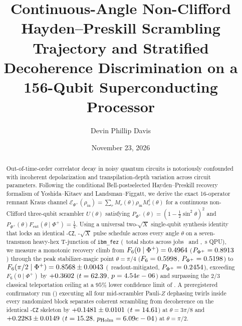 \documentclass[aps,prx,twocolumn,superscriptaddress,nofootinbib]{revtex4-2}
\begin{document}
\title{Continuous-Angle Non-Clifford Hayden--Preskill Scrambling Trajectory and Stratified Decoherence Discrimination on a 156-Qubit Superconducting Processor}

\author{Devin Phillip Davis}
\date{November 23, 2026}

\begin{abstract}
Out-of-time-order correlator decay in noisy quantum circuits is notoriously confounded with incoherent depolarization and transpilation-depth variation across circuit parameters. Following the conditional Bell-postselected Hayden--Preskill recovery formalism of Yoshida--Kitaev and Landsman--Figgatt, we derive the exact 16-operator remnant Kraus channel $\mathcal{E}_{\Phi^+}(\rho_{\mathrm{in}}) = \sum_r M_r(\theta)\rho_{\mathrm{in}}M_r^\dagger(\theta)$ for a continuous non-Clifford three-qubit scrambler $U(\theta)$ satisfying $P_{\Phi^+}(\theta) = (1 - \tfrac{1}{2}\sin^2\theta)^2$ and $P_{\Phi^+}(\theta)F_{\mathrm{ent}}(\theta \mid \Phi^+) = \tfrac{1}{4}$. Using a universal two-$\sqrt{X}$ single-qubit synthesis identity that locks an identical \XtopConstCZ-\texttt{CZ}, \XtopConstSX-$\sqrt{X}$ pulse schedule across every angle $\theta$ on a seven-transmon heavy-hex T-junction of \texttt{ibm\_fez} (\XtopShotsTotal\ total shots across jobs \XtopJobA\ and \XtopJobB, \XtopQpuSecTotal\,s QPU), we measure a monotonic recovery climb from $F_6(0 \mid \Phi^+) = 0.4964$ ($P_{\Phi^+} = 0.8913$) through the peak stabilizer-magic point $\theta = \pi/4$ ($F_6 = 0.5998$, $P_{\Phi^+} = 0.5198$) to $F_6(\pi/2 \mid \Phi^+) = 0.8568 \pm 0.0043$ (\XtopFPiTwoMit\ readout-mitigated, $P_{\Phi^+} = 0.2454$), exceeding $F_6(0 \mid \Phi^+)$ by $+0.3602$ ($t = 62.39$, $p = 4.54e-06$) and surpassing the $2/3$ classical teleportation ceiling at a $95\%$ lower confidence limit of \XtopFPiTwoLCL. A preregistered confirmatory run (\XtopJobB) executing all four mid-scrambler Pauli-$Z$ dephasing twirls inside every randomized block separates coherent scrambling from decoherence on the identical \XtopConstCZ-\texttt{CZ} skeleton by $+0.1481 \pm 0.0101$ ($t = 14.61$) at $\theta = 3\pi/8$ and $+0.2283 \pm 0.0149$ ($t = 15.28$, $p_{\mathrm{Holm}} = 6.09e-04$) at $\theta = \pi/2$.
\end{abstract}

\maketitle
\end{document}
